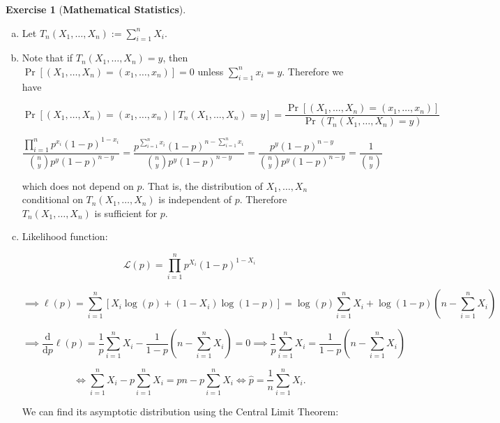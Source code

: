 \documentclass{article}
\theoremstyle{definition}
\newtheorem{exercise}{Exercise}
\theoremstyle{definition}
\theoremstyle{definition}
\theoremstyle{definition}
\newcommand{\deriv}[2]{\frac{\mathrm{d} #1}{\mathrm{d} #2}}
\begin{document}
\begin{exercise}[\textbf{Mathematical Statistics}]

\begin{enumerate}[(a)]

\item Let \(\boxed{T_n (X_1, \ldots, X_n) := \sum_{i=1}^n X_i.}\) 


\item Note that if \(T_n(X_1, \ldots, X_n) = y\), then \(\Pr \left[  (X_1, \ldots, X_n)  = (x_1, \ldots, x_n)  \right] = 0\) unless \(\sum_{i=1}^n x_i = y\). Therefore we have

\[
\Pr \left[  (X_1, \ldots, X_n)  = (x_1, \ldots, x_n) \mid T_n (X_1, \ldots, X_n) = y  \right] = \frac{\Pr \left[  (X_1, \ldots, X_n)  = (x_1, \ldots, x_n)  \right] }{\Pr\left(  T_n (X_1, \ldots, X_n) = y \right)}
\]

%
\[
\frac{\prod_{i=1}^n p^{x_i} (1-p)^{1-x_i}}{\binom{n}{y} p^y(1-p)^{n-y}} = \frac{ p^{\sum_{i=1}^n x_i} (1-p)^{n-\sum_{i=1}^n x_i}}{\binom{n}{y} p^y(1-p)^{n-y}}   = \frac{ p^{y} (1-p)^{n-y}}{\binom{n}{y} p^y(1-p)^{n-y}}   = \frac{1}{\binom{n}{y}}
\]

which does not depend on \(p\). That is, the distribution of \(X_1, \ldots, X_n\) conditional on \(T_n(X_1, \ldots, X_n)\) is independent of \(p\). Therefore \(T_n(X_1, \ldots, X_n)\) is sufficient for \(p\).


\item Likelihood function:

\[
\mathcal{L}(p) = \prod_{i=1}^n p^{X_i} (1-p)^{1-X_i} 
\]


\[
\implies \ell(p) = \sum_{i=1}^n \left[ X_i \log(p) + (1-X_i) \log(1-p) \right] = \log(p)  \sum_{i=1}^n X_i +  \log(1-p)\left(n -  \sum_{i=1}^n  X_i \right) 
\]

\[
\implies \deriv{}{p} \ell(p) =\frac{1}{p}  \sum_{i=1}^n X_i - \frac{1}{1-p}\left(n -  \sum_{i=1}^n  X_i \right) = 0 \implies \frac{1}{p}  \sum_{i=1}^n X_i  = \frac{1}{1-p}\left(n -  \sum_{i=1}^n  X_i \right)
\]

\[
\iff  \sum_{i=1}^n X_i - p  \sum_{i=1}^n X_i= pn - p \sum_{i=1}^n X_i \iff \boxed{ \hat{p} = \frac{1}{n} \sum_{i=1}^n X_i.}
\]

We can find its asymptotic distribution using the Central Limit Theorem:



\end{enumerate}
\end{exercise}
\end{document}
